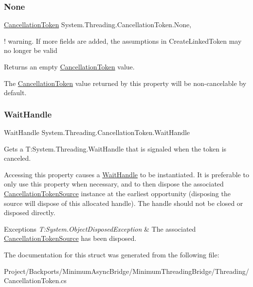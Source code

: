 \subsubsection{\texorpdfstring{None}{None}}
{\footnotesize\ttfamily \hyperlink{struct_system_1_1_threading_1_1_cancellation_token}{Cancellation\+Token} System.\+Threading.\+Cancellation\+Token.\+None\hspace{0.3cm}{\ttfamily [static]}, {\ttfamily [get]}}



! warning. If more fields are added, the assumptions in Create\+Linked\+Token may no longer be valid 

Returns an empty \hyperlink{struct_system_1_1_threading_1_1_cancellation_token}{Cancellation\+Token} value. 

The \hyperlink{struct_system_1_1_threading_1_1_cancellation_token}{Cancellation\+Token} value returned by this property will be non-\/cancelable by default. \mbox{\label{struct_system_1_1_threading_1_1_cancellation_token_afa0dab8fb50808aa34e813683d47611b}} 
\subsubsection{\texorpdfstring{Wait\+Handle}{WaitHandle}}
{\footnotesize\ttfamily Wait\+Handle System.\+Threading.\+Cancellation\+Token.\+Wait\+Handle\hspace{0.3cm}{\ttfamily [get]}}



Gets a T\+:\+System.\+Threading.\+Wait\+Handle that is signaled when the token is canceled.

Accessing this property causes a \hyperlink{}{Wait\+Handle} to be instantiated. It is preferable to only use this property when necessary, and to then dispose the associated \hyperlink{class_system_1_1_threading_1_1_cancellation_token_source}{Cancellation\+Token\+Source} instance at the earliest opportunity (disposing the source will dispose of this allocated handle). The handle should not be closed or disposed directly. 


\begin{DoxyExceptions}{Exceptions}
{\em T\+:\+System.\+Object\+Disposed\+Exception} & The associated \hyperlink{}{Cancellation\+Token\+Source} has been disposed.\\
\hline
\end{DoxyExceptions}


The documentation for this struct was generated from the following file\+:\begin{DoxyCompactItemize}
\item 
Project/\+Backports/\+Minimum\+Async\+Bridge/\+Minimum\+Threading\+Bridge/\+Threading/Cancellation\+Token.\+cs\end{DoxyCompactItemize}
